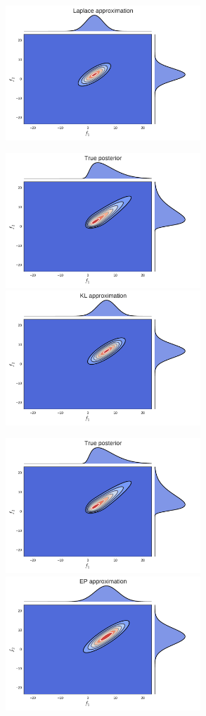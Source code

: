 \documentclass[serif, mathserif, professionalfont]{beamer} %
\begin{document}
{\begin{overprint}
{            \includegraphics[width=0.55\textwidth]{../diagrams/joint_laplace.pdf}
        }
        \centerline{
            \includegraphics[width=0.55\textwidth]{../diagrams/joint_posterior.pdf}
            \includegraphics[width=0.55\textwidth]{../diagrams/joint_kl.pdf}
        }
        \centerline{
            \includegraphics[width=0.55\textwidth]{../diagrams/joint_posterior.pdf}
            \includegraphics[width=0.55\textwidth]{../diagrams/joint_ep.pdf}
}
\end{overprint}}
\end{document}
